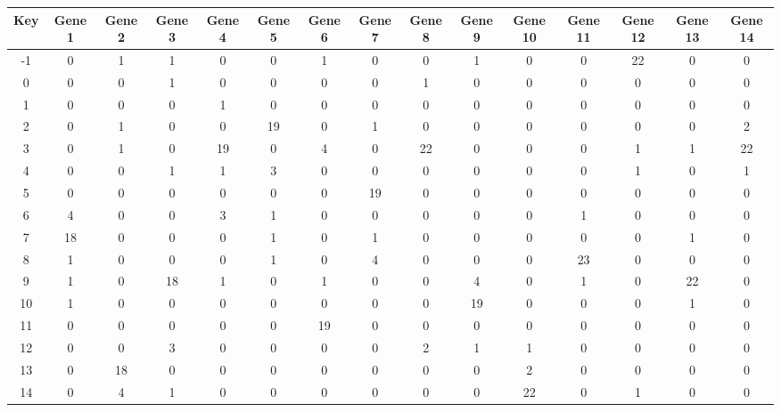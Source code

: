 \begin{tabular}{|c|c|c|c|c|c|c|c|c|c|c|c|c|c|c|}
\hline
Key & Gene 1 & Gene 2 & Gene 3 & Gene 4 & Gene 5 & Gene 6 & Gene 7 & Gene 8 & Gene 9 & Gene 10 & Gene 11 & Gene 12 & Gene 13 & Gene 14 \\
\hline
-1 & 0 & 1 & 1 & 0 & 0 & 1 & 0 & 0 & 1 & 0 & 0 & 22 & 0 & 0 \\
0 & 0 & 0 & 1 & 0 & 0 & 0 & 0 & 1 & 0 & 0 & 0 & 0 & 0 & 0 \\
1 & 0 & 0 & 0 & 1 & 0 & 0 & 0 & 0 & 0 & 0 & 0 & 0 & 0 & 0 \\
2 & 0 & 1 & 0 & 0 & 19 & 0 & 1 & 0 & 0 & 0 & 0 & 0 & 0 & 2 \\
3 & 0 & 1 & 0 & 19 & 0 & 4 & 0 & 22 & 0 & 0 & 0 & 1 & 1 & 22 \\
4 & 0 & 0 & 1 & 1 & 3 & 0 & 0 & 0 & 0 & 0 & 0 & 1 & 0 & 1 \\
5 & 0 & 0 & 0 & 0 & 0 & 0 & 19 & 0 & 0 & 0 & 0 & 0 & 0 & 0 \\
6 & 4 & 0 & 0 & 3 & 1 & 0 & 0 & 0 & 0 & 0 & 1 & 0 & 0 & 0 \\
7 & 18 & 0 & 0 & 0 & 1 & 0 & 1 & 0 & 0 & 0 & 0 & 0 & 1 & 0 \\
8 & 1 & 0 & 0 & 0 & 1 & 0 & 4 & 0 & 0 & 0 & 23 & 0 & 0 & 0 \\
9 & 1 & 0 & 18 & 1 & 0 & 1 & 0 & 0 & 4 & 0 & 1 & 0 & 22 & 0 \\
10 & 1 & 0 & 0 & 0 & 0 & 0 & 0 & 0 & 19 & 0 & 0 & 0 & 1 & 0 \\
11 & 0 & 0 & 0 & 0 & 0 & 19 & 0 & 0 & 0 & 0 & 0 & 0 & 0 & 0 \\
12 & 0 & 0 & 3 & 0 & 0 & 0 & 0 & 2 & 1 & 1 & 0 & 0 & 0 & 0 \\
13 & 0 & 18 & 0 & 0 & 0 & 0 & 0 & 0 & 0 & 2 & 0 & 0 & 0 & 0 \\
14 & 0 & 4 & 1 & 0 & 0 & 0 & 0 & 0 & 0 & 22 & 0 & 1 & 0 & 0 \\
\hline
\end{tabular}